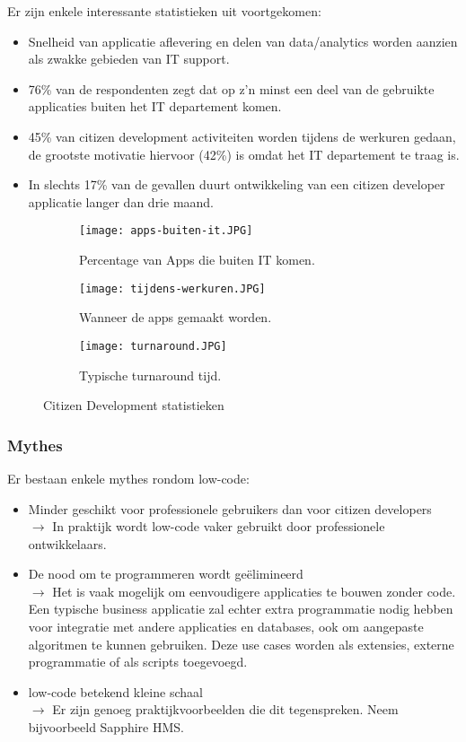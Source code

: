 Er zijn enkele interessante statistieken uit voortgekomen:
\begin{itemize}
    \item Snelheid van applicatie aflevering en delen van data/analytics worden aanzien als zwakke gebieden van IT support.
    \item 76\% van de respondenten zegt dat op z'n minst een deel van de gebruikte applicaties buiten het IT departement komen.
    \item 45\% van citizen development activiteiten worden tijdens de werkuren gedaan, de grootste motivatie hiervoor (42\%) is omdat het IT departement te traag is.
    \item In slechts 17\% van de gevallen duurt ontwikkeling van een citizen developer applicatie langer dan drie maand.
\end{itemize}

\begin{figure}[h!]
    \centering
    \begin{subfigure}[b]{0.4\linewidth}
        \texttt{[image: apps-buiten-it.JPG]}
        \caption{Percentage van Apps die buiten IT komen.}
    \end{subfigure}
    \begin{subfigure}[b]{0.45\linewidth}
        \texttt{[image: tijdens-werkuren.JPG]}
        \caption{Wanneer de apps gemaakt worden.}
    \end{subfigure}
    \begin{subfigure}[b]{0.45\linewidth}
    \texttt{[image: turnaround.JPG]}
    \caption{Typische turnaround tijd.}
    \end{subfigure}
    \caption{Citizen Development statistieken \autocite{McKendrick2017}}
    \label{fig:test2cols}
\end{figure}

\subsubsection{Mythes}

Er bestaan enkele mythes rondom low-code:
\begin{itemize}
    \item Minder geschikt voor professionele gebruikers dan voor citizen developers \\
    $\rightarrow$ In praktijk wordt low-code vaker gebruikt door professionele ontwikkelaars.
    \item De nood om te programmeren wordt geëlimineerd \\
    $\rightarrow$ Het is vaak mogelijk om eenvoudigere applicaties te bouwen zonder code. Een typische business applicatie zal echter extra programmatie nodig hebben voor integratie met andere applicaties en databases, ook om aangepaste algoritmen te kunnen gebruiken. Deze use cases worden als extensies, externe programmatie of als scripts toegevoegd.
    \item low-code betekend kleine schaal \\
    $\rightarrow$ Er zijn genoeg praktijkvoorbeelden die dit tegenspreken. Neem bijvoorbeeld Sapphire HMS. \autocite{Bashar2017}
\end{itemize} \autocite{Richardson2016}

